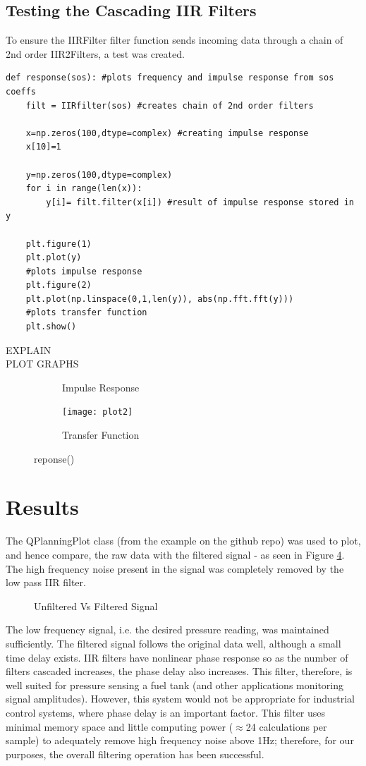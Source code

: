 \documentclass{article}
\begin{document}
\subsection{Testing the Cascading IIR Filters}
To ensure the IIRFilter filter function sends incoming data through a chain of 2nd order IIR2Filters, a test was created.
\begin{lstlisting}
def response(sos): #plots frequency and impulse response from sos coeffs
    filt = IIRfilter(sos) #creates chain of 2nd order filters

    x=np.zeros(100,dtype=complex) #creating impulse response
    x[10]=1

    y=np.zeros(100,dtype=complex)
    for i in range(len(x)):
        y[i]= filt.filter(x[i]) #result of impulse response stored in y
        
    plt.figure(1)
    plt.plot(y)
    #plots impulse response
    plt.figure(2)
    plt.plot(np.linspace(0,1,len(y)), abs(np.fft.fft(y)))
    #plots transfer function
    plt.show()
\end{lstlisting}
EXPLAIN\\
PLOT GRAPHS
\begin{figure}[H]
\centering
\begin{subfigure}{.5\textwidth}
  \centering
  
  \caption{Impulse Response}
  \label{fig:a}
\end{subfigure}%
\begin{subfigure}{.5\textwidth}
  \centering
  \texttt{[image: plot2]}
  \caption{Transfer Function}
  \label{fig:b}
\end{subfigure}
\caption{reponse()}
\label{fig:setUp}
\end{figure}

\section{Results}
The QPlanningPlot class (from the example on the github repo) was used to plot, and hence compare, the raw data with the filtered signal - as seen in Figure \ref{fig:filtered}. The high frequency noise present in the signal was completely removed by the low pass IIR filter. 
\begin{figure}[H]
    \centering
    
    \caption{Unfiltered Vs Filtered Signal}
    \label{fig:filtered}
\end{figure}
The low frequency signal, i.e. the desired pressure reading, was maintained sufficiently. The filtered signal follows the original data well, although a small time delay exists. IIR filters have nonlinear phase response so as the number of filters cascaded increases, the phase delay also increases. This filter, therefore, is well suited for pressure sensing a fuel tank (and other applications monitoring signal amplitudes). However, this system would not be appropriate for industrial control systems, where phase delay is an important factor.\newline
This filter uses minimal memory space and little computing power ($\approx$24 calculations per sample) to adequately remove high frequency noise above 1Hz; therefore, for our purposes, the overall filtering operation has been successful. 
\end{document}
